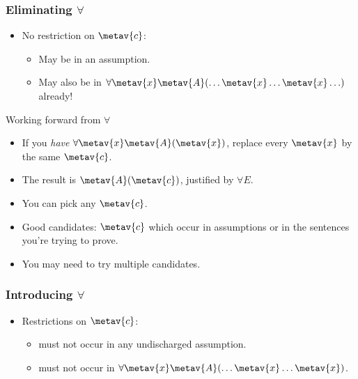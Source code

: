 \begin{frame}
  \frametitle{Eliminating $\forall$}

  \begin{fitchproof}
     
  \end{fitchproof}
  \begin{itemize}
    \item No restriction on $\metav{c}$:
    \begin{itemize}[<+->]
      \item May be in an assumption.
      \item May also be in $\forall \metav{x}\metav{A}(\ldots \metav{x}
      \ldots \metav{x}\ldots)$ already!
    \end{itemize}
  \end{itemize}
\end{frame}

\begin{frame}{Working forward from $\forall$}

  \begin{itemize}[<+->]
    \item If you \emph{have $\forall \metav{x}\metav{A}(\metav{x})$}, replace every $\metav{x}$ by the
      same $\metav{c}$.
    \item The result is $\metav{A}(\metav{c})$, justified by $\forall E$.
    \item You can pick any $\metav{c}$.
    \item Good candidates: $\metav{c}$ which occur in assumptions or
      in the sentences you're trying to prove.
    \item You may need to try multiple candidates.
    \end{itemize}
\end{frame}

\begin{frame}
  \frametitle{Introducing $\forall$}
  
  \begin{fitchproof}
     
  \end{fitchproof}

  \begin{itemize}[<+->]
  \item Restrictions on $\metav{c}$:
  \begin{itemize}
    \item must not occur in any undischarged assumption.
    \item must not occur in $\forall \metav{x}\metav{A}(\ldots \metav{x} \ldots \metav{x})$.
  \end{itemize}
\end{itemize}
\end{frame}

